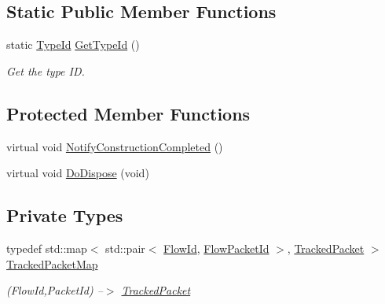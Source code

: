 \subsection*{Static Public Member Functions}
\begin{DoxyCompactItemize}
\item 
static \hyperlink{classns3_1_1TypeId}{Type\+Id} \hyperlink{classns3_1_1FlowMonitor_af008c9694678b4e7a1a7d979e71a7c1d}{Get\+Type\+Id} ()
\begin{DoxyCompactList}\small\item\em Get the type ID. \end{DoxyCompactList}\end{DoxyCompactItemize}
\subsection*{Protected Member Functions}
\begin{DoxyCompactItemize}
\item 
virtual void \hyperlink{classns3_1_1FlowMonitor_a93ee259addd586e75ad57101356853f8}{Notify\+Construction\+Completed} ()
\item 
virtual void \hyperlink{classns3_1_1FlowMonitor_ace3e74ed05b18253c25e7c6db115cdec}{Do\+Dispose} (void)
\end{DoxyCompactItemize}
\subsection*{Private Types}
\begin{DoxyCompactItemize}
\item 
typedef std\+::map$<$ std\+::pair$<$ \hyperlink{group__flow-monitor_ga39a766c4a370cdb9ab8ac85da4b288e9}{Flow\+Id}, \hyperlink{group__flow-monitor_gaa1cb18250e1672975204f1254b8aa2ae}{Flow\+Packet\+Id} $>$, \hyperlink{structns3_1_1FlowMonitor_1_1TrackedPacket}{Tracked\+Packet} $>$ \hyperlink{classns3_1_1FlowMonitor_a52f3dc79e3f9c4e60e70064ffb306b53}{Tracked\+Packet\+Map}
\begin{DoxyCompactList}\small\item\em (Flow\+Id,Packet\+Id) --$>$ \hyperlink{structns3_1_1FlowMonitor_1_1TrackedPacket}{Tracked\+Packet} \end{DoxyCompactList}\end{DoxyCompactItemize}

